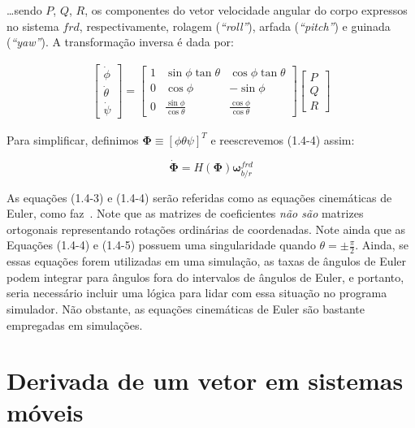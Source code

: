 \ldots sendo \(P\), \(Q\), \(R\), os componentes do vetor velocidade angular do corpo expressos no sistema \(frd\), respectivamente, rolagem (\emph{``roll''}), arfada (\emph{``pitch''}) e guinada (\emph{``yaw''}). A transformação inversa é dada por:

\begin{align} \tag{1.4-4}
    \begin{bmatrix}
        \dot\phi \\
        \dot\theta \\
        \dot\psi
    \end{bmatrix}
    =
    \begin{bmatrix}
        1 & \sin{\phi}\tan{\theta} & \cos{\phi}\tan{\theta} \\
        0 & \cos{\phi} & -\sin{\phi} \\
        0 & \frac{\sin{\phi}}{\cos{\theta}} & \frac{\cos{\phi}}{\cos{\theta}}
    \end{bmatrix}
    \begin{bmatrix}
        P \\ Q \\ R
    \end{bmatrix}
\end{align}

Para simplificar, definimos \(\mathbf{\Phi} \equiv \left[\phi \theta \psi \right]^T \) e reescrevemos  (1.4-4) assim:

\begin{equation} \tag{1.4-5}
    \dot{\mathbf{\Phi}} = H \left( \mathbf{\Phi} \right) \mathbf{\omega}^{frd}_{b/r}
\end{equation}

As equações (1.4-3) e (1.4-4) serão referidas como as equações cinemáticas de Euler, como faz~\cite{Stevens2016}. Note que as matrizes de coeficientes \emph{não são} matrizes ortogonais representando rotações ordinárias de coordenadas. Note ainda que as Equações (1.4-4) e (1.4-5) possuem uma singularidade quando  \(\theta = \pm \frac{\pi}{2}\). Ainda, se essas equações forem utilizadas em uma simulação, as taxas de ângulos de Euler podem integrar para ângulos fora do intervalos de ângulos de Euler, e portanto, seria necessário incluir uma lógica para lidar com essa situação no programa simulador. Não obstante, as equações cinemáticas de Euler são bastante empregadas em simulações.

\section{Derivada de um vetor em sistemas móveis}

